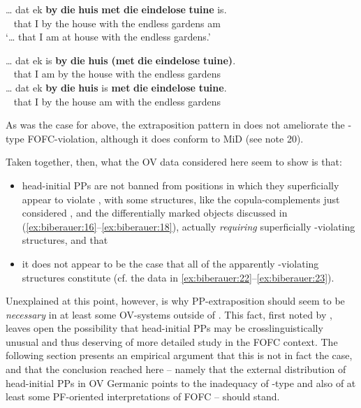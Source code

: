 \documentclass[output=paper]{LSP/langsci}
\begin{document}
\ea%
    \label{ex:biberauer:25} 

	 \ea   \label{ex:biberauer:25a} 
\gll  … dat  ek \textbf{by} \textbf{die} \textbf{huis} \textbf{met} \textbf{die} \textbf{eindelose} \textbf{tuine}  is.\\
      ~ that I   by the  house with the endless     gardens am\\
  \glt ‘… that I am at house with the endless gardens.’

 \ex  \label{ex:biberauer:25b} 
\gll   *… dat  ek is   \textbf{by} \textbf{die} \textbf{huis} \textbf{(met} \textbf{die} \textbf{eindelose} \textbf{tuine)}.\\
      ~   that I   am by the house with the endless     gardens\\

 \ex  \label{ex:biberauer:25c} 
\gll   … dat ek \textbf{by} \textbf{die} \textbf{huis}   is  \textbf{met} \textbf{die} \textbf{eindelose} \textbf{tuine}.\\
       ~  that I   by the house am with the endless    gardens\\
\z
\z

As was the case for  above, the extraposition pattern in  does not ameliorate the -type FOFC-violation, although it does conform to MiD (see note 20). 

Taken together, then, what the OV  data considered here seem to show is that:


\begin{itemize}
\item 
head-initial PPs are not banned from positions in which they superficially appear to violate , with some structures, like the copula-complements just considered , and the differentially marked objects discussed in (\ref{ex:biberauer:16}--\ref{ex:biberauer:18}), actually \textit{requiring} superficially -violating structures, and that 
\item 
it does not appear to be the case that all of the apparently -violating structures constitute  (cf. the data in \ref{ex:biberauer:22}--\ref{ex:biberauer:23}).
\end{itemize}

Unexplained at this point, however, is why PP-extraposition should seem to be \textit{necessary} in at least some OV-systems outside of . This fact, first noted by \citet{Sheehan2008}, leaves open the possibility that  head-initial PPs may be crosslinguistically unusual and thus deserving of more detailed study in the FOFC context. The following section presents an empirical argument that this is not in fact the case, and that the conclusion reached here – namely that the external distribution of head-initial PPs in OV Germanic points to the inadequacy of -type and also of at least some PF-oriented interpretations of FOFC – should stand.
\end{document}
